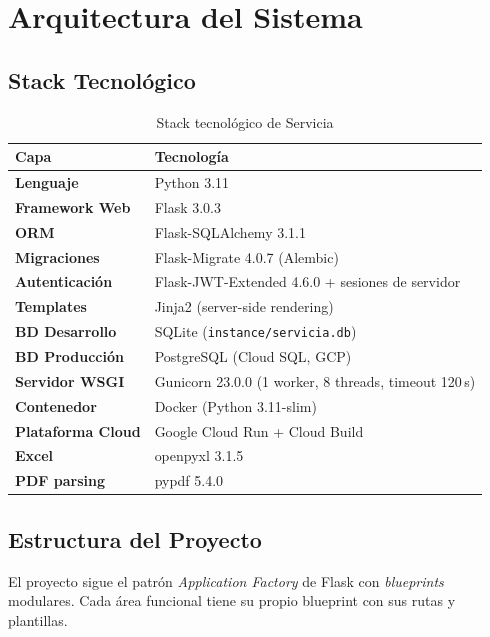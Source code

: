 \documentclass[12pt,a4paper]{article}
\begin{document}
\newpage

\section{Arquitectura del Sistema}

\subsection{Stack Tecnol\'ogico}

\begin{table}[h!]
\centering
\begin{tabularx}{\textwidth}{>{\bfseries}lX}
\toprule
Capa & Tecnolog\'ia \\
\midrule
Lenguaje & Python 3.11 \\
Framework Web & Flask 3.0.3 \\
ORM & Flask-SQLAlchemy 3.1.1 \\
Migraciones & Flask-Migrate 4.0.7 (Alembic) \\
Autenticaci\'on & Flask-JWT-Extended 4.6.0 + sesiones de servidor \\
Templates & Jinja2 (server-side rendering) \\
BD Desarrollo & SQLite (\texttt{instance/servicia.db}) \\
BD Producci\'on & PostgreSQL (Cloud SQL, GCP) \\
Servidor WSGI & Gunicorn 23.0.0 (1 worker, 8 threads, timeout 120\,s) \\
Contenedor & Docker (Python 3.11-slim) \\
Plataforma Cloud & Google Cloud Run + Cloud Build \\
Excel & openpyxl 3.1.5 \\
PDF parsing & pypdf 5.4.0 \\
\bottomrule
\end{tabularx}
\caption{Stack tecnol\'ogico de Servicia}
\end{table}

\subsection{Estructura del Proyecto}

El proyecto sigue el patr\'on \textit{Application Factory} de Flask con
\textit{blueprints} modulares. Cada \'area funcional tiene su propio blueprint
con sus rutas y plantillas.
\end{document}
